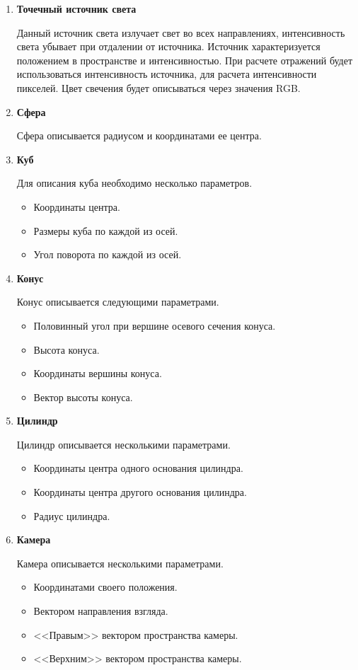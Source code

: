 \begin{enumerate}
	\item  \textbf{Точечный источник света}
	
	Данный источник света излучает свет во всех направлениях, интенсивность света убывает при отдалении от источника.
	Источник характеризуется положением в пространстве и интенсивностью.
	При расчете отражений будет использоваться интенсивность источника, для расчета интенсивности пикселей. Цвет свечения будет описываться через значения RGB.
	
	
	
	\item \textbf{Сфера}
	
	Сфера описывается радиусом и координатами ее центра.
	
	\item  \textbf{Куб}
	
	Для описания куба необходимо несколько параметров.
	\begin{itemize}
		\item Координаты центра.
		\item Размеры куба по каждой из осей.
		\item Угол поворота по каждой из осей.
	\end{itemize}
	\item  \textbf{Конус}
	
	Конус описывается следующими параметрами.
	\begin{itemize}
		\item Половинный угол при вершине осевого сечения конуса.
		\item Высота конуса.
		\item Координаты вершины конуса.
		\item Вектор высоты конуса.
	\end{itemize}
	
	\item  \textbf{Цилиндр}
	
	Цилиндр описывается несколькими параметрами.
	\begin{itemize}
		\item Координаты центра одного основания цилиндра.
		\item Координаты центра другого основания цилиндра.
		\item Радиус цилиндра.
	\end{itemize}
	
	
	\item \textbf{Камера}
	
	Камера описывается несколькими параметрами.
	\begin{itemize}
		\item Координатами своего положения.
		\item Вектором направления взгляда.
		\item <<Правым>> вектором пространства камеры.
		\item <<Верхним>> вектором пространства камеры.
	\end{itemize}
\end{enumerate}

